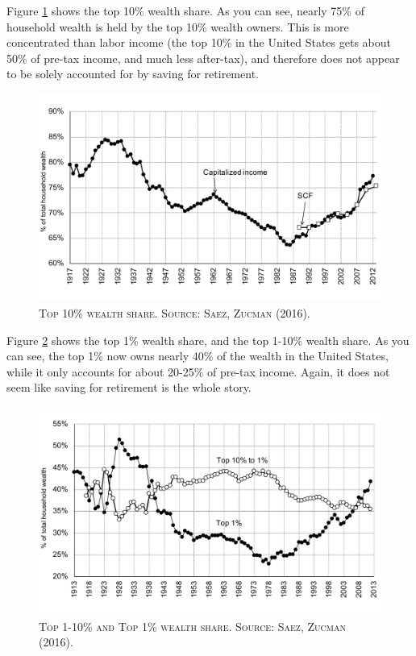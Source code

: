 \documentclass[]{book}
\begin{document}
Figure \ref{fig:saez-zucman-fig6a} shows the top 10\% wealth share. As
you can see, nearly 75\% of household wealth is held by the top 10\%
wealth owners. This is more concentrated than labor income (the top 10\%
in the United States gets about 50\% of pre-tax income, and much less
after-tax), and therefore does not appear to be solely accounted for by
saving for retirement.




\begin{figure}

{\centering \includegraphics[width=1\linewidth,height=1\textheight]{figures/SaezZucman2016/fig6a} 

}

\caption{\textsc{Top 10\% wealth share. Source: Saez,
Zucman (2016)}.}\label{fig:saez-zucman-fig6a}
\end{figure}

Figure \ref{fig:saez-zucman-fig6b} shows the top 1\% wealth share, and
the top 1-10\% wealth share. As you can see, the top 1\% now owns nearly
40\% of the wealth in the United States, while it only accounts for
about 20-25\% of pre-tax income. Again, it does not seem like saving for
retirement is the whole story.




\begin{figure}

{\centering \includegraphics[width=1\linewidth,height=1\textheight]{figures/SaezZucman2016/fig6b} 

}

\caption{\textsc{Top 1-10\% and Top 1\% wealth share.
Source: Saez, Zucman (2016)}.}\label{fig:saez-zucman-fig6b}
\end{figure}
\end{document}

